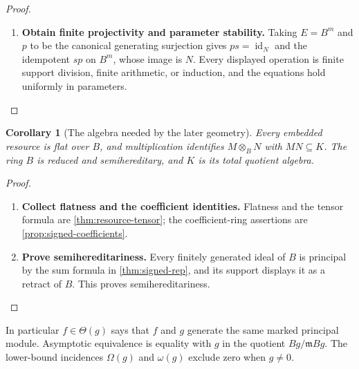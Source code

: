 \documentclass[11pt,a4paper]{article}
\numberwithin{algorithm}{section}
\numberwithin{equation}{section}
\newtheorem{corollary}[corollary]{Corollary}
\theoremstyle{definition}
\theoremstyle{remark}
\theoremstyle{plain}
\newcommand{\id}{\operatorname{id}}
\theoremstyle{definition}
\theoremstyle{plain}
\begin{document}
\begin{proof}
\begin{enumerate}[leftmargin=*,align=left]
\item \textbf{Obtain finite projectivity and parameter stability.}
Taking $E=B^m$ and $p$ to be the canonical generating
surjection gives $ps=\id_N$ and the idempotent $sp$ on $B^m$,
whose image is $N$. Every displayed operation is finite support
division, finite arithmetic, or induction, and the equations hold
uniformly in parameters.
\end{enumerate}
\end{proof}

\begin{corollary}[The algebra needed by the later geometry]
Every embedded resource is flat over $B$, and multiplication identifies
$M\otimes_BN$ with $MN\subseteq K$. The ring $B$ is reduced and
semihereditary, and $K$ is its total quotient algebra.
\end{corollary}
\begin{proof}\leavevmode
\begin{enumerate}[leftmargin=*,align=left]
\item \textbf{Collect flatness and the coefficient identities.}
Flatness and the tensor formula are \cref{thm:resource-tensor}; the
coefficient-ring assertions are \cref{prop:signed-coefficients}.

\item \textbf{Prove semihereditariness.}
Every finitely generated ideal of $B$ is principal by the sum formula
in \cref{thm:signed-rep}, and its support displays it as a retract of
$B$. This proves semihereditariness.
\end{enumerate}
\end{proof}

In particular $f\in\Theta(g)$ says that $f$ and $g$ generate
the same marked principal module. Asymptotic equivalence is
equality with $g$ in the quotient
$Bg/\mathfrak m Bg$. The lower-bound incidences $\Omega(g)$ and $\omega(g)$ exclude zero when $g\ne0$.
\end{document}

